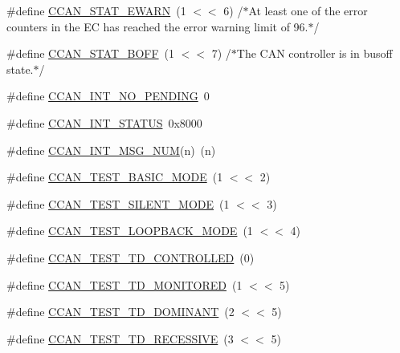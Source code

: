 \begin{DoxyCompactItemize}
\#define \hyperlink{group___c_c_a_n__18_x_x__43_x_x_ga1775fca8e7a3c3c5b4572f4a60be573b}{C\+C\+A\+N\+\_\+\+S\+T\+A\+T\+\_\+\+E\+W\+A\+RN}~(1 $<$$<$ 6)	/$\ast$At least one of the error counters in the EC has reached the error warning limit of 96.$\ast$/
\item 
\#define \hyperlink{group___c_c_a_n__18_x_x__43_x_x_gaf5bda007aa17c3fe3f8a8417dd5feb1e}{C\+C\+A\+N\+\_\+\+S\+T\+A\+T\+\_\+\+B\+O\+FF}~(1 $<$$<$ 7)	/$\ast$The C\+AN controller is in busoff state.$\ast$/
\item 
\#define \hyperlink{group___c_c_a_n__18_x_x__43_x_x_ga6729e4f8bb1311806c9437247ba43b09}{C\+C\+A\+N\+\_\+\+I\+N\+T\+\_\+\+N\+O\+\_\+\+P\+E\+N\+D\+I\+NG}~0
\item 
\#define \hyperlink{group___c_c_a_n__18_x_x__43_x_x_gaa3060227684cfad8ba747a13eae24bdc}{C\+C\+A\+N\+\_\+\+I\+N\+T\+\_\+\+S\+T\+A\+T\+US}~0x8000
\item 
\#define \hyperlink{group___c_c_a_n__18_x_x__43_x_x_ga070e17d49a2c87d14452ff17fcbf212e}{C\+C\+A\+N\+\_\+\+I\+N\+T\+\_\+\+M\+S\+G\+\_\+\+N\+UM}(n)~(n)
\item 
\#define \hyperlink{group___c_c_a_n__18_x_x__43_x_x_ga5b82b859cbcbfbea3ee778cfdcde0e85}{C\+C\+A\+N\+\_\+\+T\+E\+S\+T\+\_\+\+B\+A\+S\+I\+C\+\_\+\+M\+O\+DE}~(1 $<$$<$ 2)
\item 
\#define \hyperlink{group___c_c_a_n__18_x_x__43_x_x_ga106d940b349f6405cd9b29fb96e7be2c}{C\+C\+A\+N\+\_\+\+T\+E\+S\+T\+\_\+\+S\+I\+L\+E\+N\+T\+\_\+\+M\+O\+DE}~(1 $<$$<$ 3)
\item 
\#define \hyperlink{group___c_c_a_n__18_x_x__43_x_x_ga9ee2a6a2c209e479ef82adb269ac3919}{C\+C\+A\+N\+\_\+\+T\+E\+S\+T\+\_\+\+L\+O\+O\+P\+B\+A\+C\+K\+\_\+\+M\+O\+DE}~(1 $<$$<$ 4)
\item 
\#define \hyperlink{group___c_c_a_n__18_x_x__43_x_x_gaf071106b7661b748890a07ebdeeba2f2}{C\+C\+A\+N\+\_\+\+T\+E\+S\+T\+\_\+\+T\+D\+\_\+\+C\+O\+N\+T\+R\+O\+L\+L\+ED}~(0)
\item 
\#define \hyperlink{group___c_c_a_n__18_x_x__43_x_x_gaab61e1f43219a34dc6dd86a0c1c367b8}{C\+C\+A\+N\+\_\+\+T\+E\+S\+T\+\_\+\+T\+D\+\_\+\+M\+O\+N\+I\+T\+O\+R\+ED}~(1 $<$$<$ 5)
\item 
\#define \hyperlink{group___c_c_a_n__18_x_x__43_x_x_gacc375f1ade23712882d71808600ad0f2}{C\+C\+A\+N\+\_\+\+T\+E\+S\+T\+\_\+\+T\+D\+\_\+\+D\+O\+M\+I\+N\+A\+NT}~(2 $<$$<$ 5)
\item 
\#define \hyperlink{group___c_c_a_n__18_x_x__43_x_x_gab0d2186b5d8b7936ee151e406422ac1c}{C\+C\+A\+N\+\_\+\+T\+E\+S\+T\+\_\+\+T\+D\+\_\+\+R\+E\+C\+E\+S\+S\+I\+VE}~(3 $<$$<$ 5)

\end{DoxyCompactItemize}
